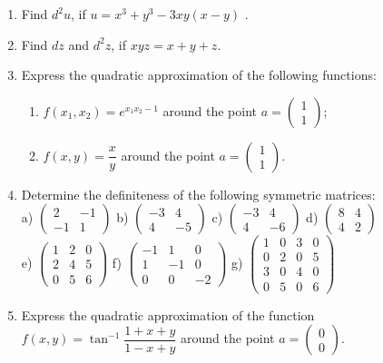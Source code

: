\documentclass[12pt]{article} %
\theoremstyle{definition} %
\begin{document}
\begin{enumerate}
\item Find $d^2u$, if $u=x^3+y^3-3xy(x-y)$ .
\item Find $dz$ and $d^2z$, if $xyz=x+y+z$.
\item Express the quadratic approximation of the following functions:
\begin{enumerate}
\item $f(x_1, x_2)=e^{x_1x_2-1}$ around the point $a=\begin{pmatrix}1\\1\end{pmatrix}$;
\item $f(x,y)=\dfrac xy$ around the point $a=\begin{pmatrix}1\\1\end{pmatrix}$.
\end{enumerate}
\item Determine the definiteness of the following symmetric matrices:\\
a) $\begin{pmatrix}2 &-1\\-1 &1\end{pmatrix}$ b) $\begin{pmatrix}-3 &4\\4 & -5\end{pmatrix}$ c) $\begin{pmatrix}-3& 4\\4 & -6\end{pmatrix}$ d) $\begin{pmatrix}8 &4\\4 &2\end{pmatrix}$\\
e) $\begin{pmatrix}1 &2 & 0\\2 &4 & 5\\ 0 & 5 & 6\end{pmatrix}$ f) $\begin{pmatrix}-1 & 1 & 0\\1 & -1 & 0\\ 0 & 0 & -2\end{pmatrix}$ g) $\begin{pmatrix}1 & 0 & 3 &0\\0 & 2 & 0 & 5\\ 3 & 0 & 4 & 0\\ 0 & 5 & 0 & 6\end{pmatrix}$
\item Express the quadratic approximation of the function $f(x,y)=\tan^{-1}\dfrac{1+x+y}{1-x+y}$ around the point $a=\begin{pmatrix}0\\0\end{pmatrix}$.

\end{enumerate}
\end{document}
